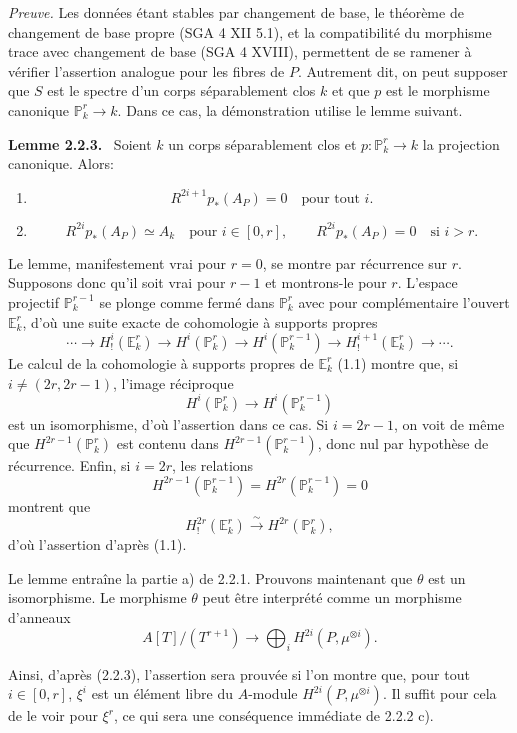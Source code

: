 \documentclass[11pt]{article}
\newenvironment{statement}[1]{\par\medskip\noindent\textbf{#1.}\ }{\par\medskip}
\begin{document}
\emph{Preuve.} Les données étant stables par changement de base, le théorème de changement de base propre (SGA 4 XII 5.1), et la compatibilité du morphisme trace avec changement de base (SGA 4 XVIII), permettent de se ramener à vérifier l'assertion analogue pour les fibres de $P$. Autrement dit, on peut supposer que $S$ est le spectre d'un corps séparablement clos $k$ et que $p$ est le morphisme canonique $\mathbb P^r_k\to k$. Dans ce cas, la démonstration utilise le lemme suivant.

\begin{statement}{Lemme 2.2.3}
Soient $k$ un corps séparablement clos et $p:\mathbb P_k^r\to k$ la projection canonique. Alors:
\begin{enumerate}[label=\alph*)]
\item
\[
R^{2i+1}p_*(A_P)=0\quad\text{pour tout }i.
\]
\item
\[
R^{2i}p_*(A_P)\simeq A_k\quad\text{pour }i\in[0,r],
\qquad
R^{2i}p_*(A_P)=0\quad\text{si }i>r.
\]
\end{enumerate}
\end{statement}

Le lemme, manifestement vrai pour $r=0$, se montre par récurrence sur $r$. Supposons donc qu'il soit vrai pour $r-1$ et montrons-le pour $r$. L'espace projectif $\mathbb P_k^{r-1}$ se plonge comme fermé dans $\mathbb P_k^r$ avec pour complémentaire l'ouvert $\mathbb E_k^r$, d'où une suite exacte de cohomologie à supports propres
\[
\cdots\longrightarrow H_!^i(\mathbb E_k^r)\longrightarrow H^i(\mathbb P_k^r)
\longrightarrow H^i(\mathbb P_k^{r-1})\longrightarrow H_!^{i+1}(\mathbb E_k^r)\longrightarrow\cdots.
\]
Le calcul de la cohomologie à supports propres de $\mathbb E_k^r$ (1.1) montre que, si $i\ne(2r,2r-1)$, l'image réciproque
\[
H^i(\mathbb P_k^r)\longrightarrow H^i(\mathbb P_k^{r-1})
\]
est un isomorphisme, d'où l'assertion dans ce cas. Si $i=2r-1$, on voit de même que $H^{2r-1}(\mathbb P_k^r)$ est contenu dans $H^{2r-1}(\mathbb P_k^{r-1})$, donc nul par hypothèse de récurrence. Enfin, si $i=2r$, les relations
\[
H^{2r-1}(\mathbb P_k^{r-1})=H^{2r}(\mathbb P_k^{r-1})=0
\]
montrent que
\[
H_!^{2r}(\mathbb E_k^r)\xrightarrow{\sim}H^{2r}(\mathbb P_k^r),
\]
d'où l'assertion d'après (1.1).

Le lemme entraîne la partie a) de 2.2.1. Prouvons maintenant que $\theta$ est un isomorphisme. Le morphisme $\theta$ peut être interprété comme un morphisme d'anneaux
\[
A[T]/(T^{r+1})\longrightarrow\bigoplus_i H^{2i}(P,\mu^{\otimes i}).
\]


Ainsi, d'après (2.2.3), l'assertion sera prouvée si l'on montre que, pour tout $i\in[0,r]$, $\xi^i$ est un élément libre du $A$-module $H^{2i}(P,\mu^{\otimes i})$. Il suffit pour cela de le voir pour $\xi^r$, ce qui sera une conséquence immédiate de 2.2.2 c).
\end{document}
